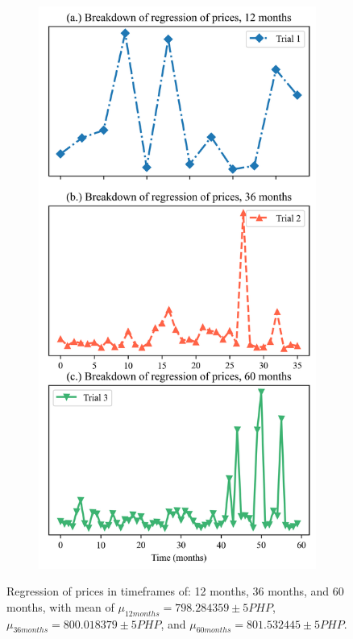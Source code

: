 \documentclass[12pt]{article}
\begin{document}
\begin{figure}[h!]
\begin{subfigure}[b]{0.51\textwidth}
	\end{subfigure}
	\hfill
	\begin{subfigure}[b]{0.45\textwidth}
		\includegraphics*[width=\textwidth]{fig_2r.png}
	\end{subfigure}
	\caption{\doublespacing Regression of prices in timeframes of: 12 months, 36 months, and 60 months, with mean of $\mu_{12 months} = 798.284359 \pm 5 PHP$, $\mu_{36 months} = 800.018379  \pm 5 PHP$, and $\mu_{60 months} = 801.532445  \pm 5 PHP$.\centering}
\end{figure}
\end{document}

